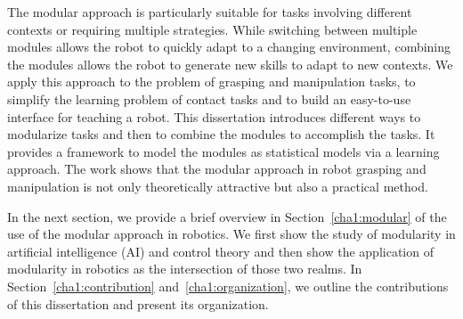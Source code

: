 The modular approach is particularly suitable for tasks involving different contexts or requiring multiple strategies. While switching between multiple modules allows the robot to quickly adapt to a changing environment, combining the modules allows the robot to generate new skills to adapt to new contexts. We apply this approach to the problem of grasping and manipulation tasks, to simplify the learning problem of contact tasks and to build an easy-to-use interface for teaching a robot. This dissertation introduces different ways to modularize tasks and then to combine the modules to accomplish the tasks. It provides a framework to model the modules as statistical models via a learning approach. The work shows that the modular approach in robot grasping and manipulation is not only theoretically attractive but also a practical method.

In the next section, we provide a brief overview in Section~\ref{cha1:modular} of the use of the modular approach in robotics. We first show the study of modularity in artificial intelligence (AI) and control theory and then show the application of modularity in robotics as the intersection of those two realms. In Section~\ref{cha1:contribution} and~\ref{cha1:organization}, we outline the contributions of this dissertation and present its organization.





